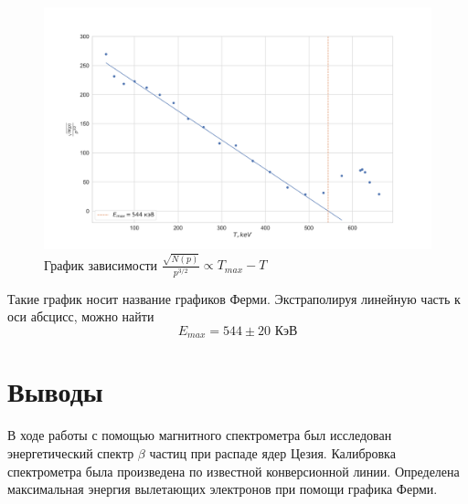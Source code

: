 \documentclass[a4paper, 12pt]{article}
\begin{document}
\begin{figure}[H]
    \centering
    \includegraphics[width=1\textwidth]{plot.png}
    \caption{График зависимости $\frac{\sqrt{N(p)}}{p^{3/2}} \propto T_{max} - T$}
    \label{fig:Fermi}
\end{figure}

Такие график носит название графиков Ферми. Экстраполируя линейную часть к оси абсцисс, можно найти
\begin{equation}
    E_{max} = 544 \pm 20 \text{ КэВ}
\end{equation}



\section{Выводы}
В ходе работы с помощью магнитного спектрометра был исследован энергетический спектр $\beta$ частиц при распаде ядер Цезия. Калибровка спектрометра
была произведена по известной конверсионной линии. Определена максимальная энергия вылетающих электронов при помощи графика Ферми. 
\end{document}
